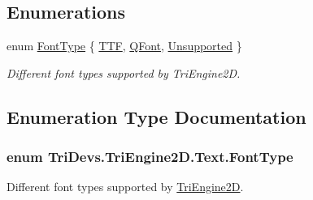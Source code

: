 \subsection*{Enumerations}
\begin{DoxyCompactItemize}
\item 
enum \hyperlink{namespace_tri_devs_1_1_tri_engine2_d_1_1_text_aa624efa98f1dcfec7cddff37f08bbe75}{Font\-Type} \{ \hyperlink{namespace_tri_devs_1_1_tri_engine2_d_1_1_text_aa624efa98f1dcfec7cddff37f08bbe75a89efbd41f5cc30a3b8a1d8465072df0e}{T\-T\-F}, 
\hyperlink{namespace_tri_devs_1_1_tri_engine2_d_1_1_text_aa624efa98f1dcfec7cddff37f08bbe75ad9365391881185588cc0b276759c9ec5}{Q\-Font}, 
\hyperlink{namespace_tri_devs_1_1_tri_engine2_d_1_1_text_aa624efa98f1dcfec7cddff37f08bbe75ab4080bdf74febf04d578ff105cce9d3f}{Unsupported}
 \}
\begin{DoxyCompactList}\small\item\em Different font types supported by Tri\-Engine2\-D. \end{DoxyCompactList}\end{DoxyCompactItemize}


\subsection{Enumeration Type Documentation}
\hypertarget{namespace_tri_devs_1_1_tri_engine2_d_1_1_text_aa624efa98f1dcfec7cddff37f08bbe75}{
\subsubsection[{Font\-Type}]{\setlength{\rightskip}{0pt plus 5cm}enum {\bf Tri\-Devs.\-Tri\-Engine2\-D.\-Text.\-Font\-Type}}}\label{namespace_tri_devs_1_1_tri_engine2_d_1_1_text_aa624efa98f1dcfec7cddff37f08bbe75}


Different font types supported by \hyperlink{namespace_tri_devs_1_1_tri_engine2_d}{Tri\-Engine2\-D}. 

